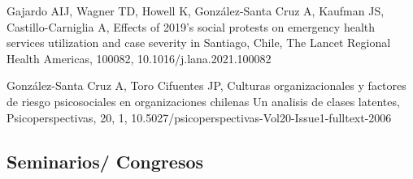 \documentclass[11pt,a4paper,]{awesome-cv}
\begin{document}
\begin{cventries}
{\begin{cvitems}
\item Gajardo AIJ, Wagner TD, Howell K, González-Santa Cruz A, Kaufman JS, Castillo-Carniglia A, Effects of 2019's social protests on emergency health services utilization and case severity in Santiago, Chile, The Lancet Regional Health Americas, 100082, 10.1016/j.lana.2021.100082
\item González-Santa Cruz A, Toro Cifuentes JP, Culturas organizacionales y factores de riesgo psicosociales en organizaciones chilenas Un analisis de clases latentes, Psicoperspectivas, 20, 1, 10.5027/psicoperspectivas-Vol20-Issue1-fulltext-2006
\end{cvitems}}
\end{cventries}

\hypertarget{seminarios-congresos}{%
\subsection{Seminarios/ Congresos}\label{seminarios-congresos}}
\end{document}
